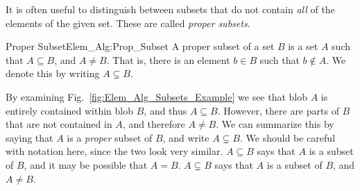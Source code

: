\documentclass[crop=false,class=book,oneside]{standalone}                      %
\begin{document}
            It is often useful to distinguish between subsets
            that do not contain \textit{all} of the elements of
            the given set. These are called \textit{proper subsets}.
            \begin{ldefinition}{Proper Subset}{Elem_Alg:Prop_Subset}
                A proper subset of a set $B$ is a set $A$ such that
                $A\subseteq{B}$, and $A\ne{B}$. That is, there is
                an element $b\in{B}$ such that $b\notin{A}$. We
                denote this by writing $A\subsetneq{B}$.
            \end{ldefinition}
            By examining Fig.~\ref{fig:Elem_Alg_Subsets_Example}
            we see that blob $A$ is entirely
            contained within blob $B$, and thus
            $A\subseteq{B}$. However, there are parts of $B$
            that are not contained in $A$, and
            therefore $A\ne{B}$. We can summarize this by
            saying that $A$ is a \textit{proper} subset of
            $B$, and write $A\subsetneq{B}$.
            We should be careful with notation here, since the
            two look very similar. $A\subseteq{B}$ says that
            $A$ is a subset of $B$, and it may be possible that
            $A=B$. $A\subsetneq{B}$ says that $A$ is a subset of
            $B$, and $A\ne{B}$.
\end{document}
